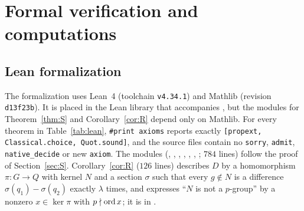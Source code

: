 \section{Formal verification and computations}\label{sec:verif}

\subsection{Lean formalization}\label{sec:lean}
The formalization uses Lean~4 (toolchain \texttt{v4.34.1}) and Mathlib
(revision \texttt{d13f23b}). It is placed in the Lean library that
accompanies \cite{OpenAI2026}, but the modules for Theorem~\ref{thm:S}
and Corollary~\ref{cor:R} depend only on Mathlib. For every theorem in
Table~\ref{tab:lean}, \texttt{\#print axioms} reports exactly
\texttt{[propext, Classical.choice, Quot.sound]}, and the source files
contain no \texttt{sorry}, \texttt{admit}, \texttt{native\_decide} or new
\texttt{axiom}. The modules  (,
, , , ,
, ; $784$ lines) follow the proof of
Section~\ref{sec:S}. Corollary~\ref{cor:R} ($126$ lines) describes $D$ by
a homomorphism $\pi:G\to Q$ with kernel $N$ and a section $\sigma$ such
that every $g\notin N$ is a difference $\sigma(q_1)-\sigma(q_2)$ exactly
$\lambda$ times, and expresses ``$N$ is not a $p$-group'' by a nonzero
$x\in\ker\pi$ with $p\nmid\operatorname{ord} x$; it is in
.

